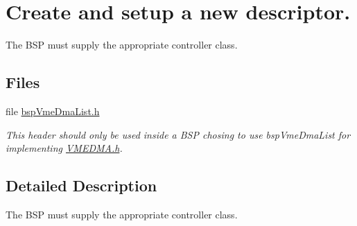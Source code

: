 \hypertarget{group__shared__bspvmedmalist}{}\section{Create and setup a new descriptor.}
\label{group__shared__bspvmedmalist}


The B\+SP must supply the appropriate controller class.  


\subsection*{Files}
\begin{DoxyCompactItemize}
\item 
file \mbox{\hyperlink{bspVmeDmaList_8h}{bsp\+Vme\+Dma\+List.\+h}}
\begin{DoxyCompactList}\small\item\em This header should only be used inside a B\+SP chosing to use bsp\+Vme\+Dma\+List for implementing \mbox{\hyperlink{VMEDMA_8h}{V\+M\+E\+D\+M\+A.\+h}}. \end{DoxyCompactList}\end{DoxyCompactItemize}


\subsection{Detailed Description}
The B\+SP must supply the appropriate controller class. 

